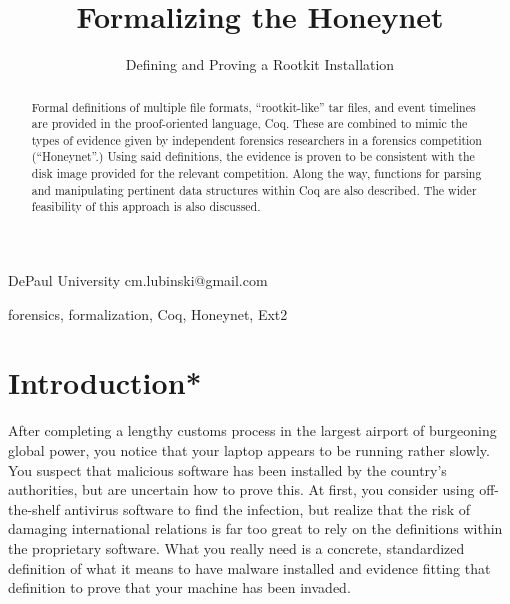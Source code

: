 \documentclass[nocopyrightspace]{sigplanconf}
\begin{document}
\lstset{language=coq, basicstyle=\ttfamily\scriptsize, columns=flexible,
keepspaces=true}

\setlength{\pdfpageheight}{\paperheight}
\setlength{\pdfpagewidth}{\paperwidth}



\title{Formalizing the Honeynet}
\subtitle{Defining and Proving a Rootkit Installation}

           {DePaul University}
           {cm.lubinski@gmail.com}

\maketitle

\begin{abstract}
Formal definitions of multiple file formats, ``rootkit-like'' tar files, and
event timelines are provided in the proof-oriented language, Coq. These are
combined to mimic the types of evidence given by independent forensics
researchers in a forensics competition (``Honeynet''.) Using said definitions,
the evidence is proven to be consistent with the disk image provided for the
relevant competition. Along the way, functions for parsing and manipulating
pertinent data structures within Coq are also described. The wider feasibility
of this approach is also discussed.
\end{abstract}

\keywords
forensics, formalization, Coq, Honeynet, Ext2

\section{Introduction*}

After completing a lengthy customs process in the largest airport of
burgeoning global power, you notice that your laptop appears to be running
rather slowly. You suspect that malicious software has been installed by the
country's authorities, but are uncertain how to prove this. At first, you
consider using off-the-shelf antivirus software to find the infection, but
realize that the risk of damaging international relations is far too great to
rely on the definitions within the proprietary software. What you really need
is a concrete, standardized definition of what it means to have malware
installed and evidence fitting that definition to prove that your machine has
been invaded.
\end{document}
